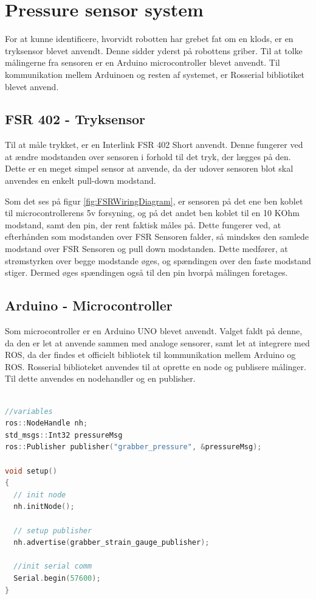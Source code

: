 \section{Pressure sensor system}
For at kunne identificere, hvorvidt robotten har grebet fat om en klods, er en tryksensor blevet anvendt. Denne sidder yderst på robottens griber. Til at tolke målingerne fra sensoren er en Arduino microcontroller blevet anvendt. Til kommunikation mellem Arduinoen og resten af systemet, er Rosserial bibliotiket blevet anvend. 

\subsection{FSR 402 - Tryksensor}
Til at måle trykket, er en Interlink FSR 402 Short anvendt. Denne fungerer ved at ændre modstanden over sensoren i forhold til det tryk, der lægges på den. Dette er en meget simpel sensor at anvende, da der udover sensoren blot skal anvendes en enkelt pull-down modstand. 


Som det ses på figur \ref{fig:FSRWiringDiagram}, er sensoren på det ene ben koblet til microcontrollerens 5v forsyning, og på det andet ben koblet til en 10 KOhm modstand, samt den pin, der rent faktisk måles på. Dette fungerer ved, at efterhånden som modstanden over FSR Sensoren falder, så mindskes den samlede modstand over FSR Sensoren og pull down modstanden. Dette medfører, at strømstyrken over begge modstande øges, og spændingen over den faste modstand stiger. Dermed øges spændingen også til den pin hvorpå målingen foretages. 

\subsection{Arduino - Microcontroller}
Som microcontroller er en Arduino UNO blevet anvendt. Valget faldt på denne, da den er let at anvende sammen med analoge sensorer, samt let at integrere med ROS, da der findes et officielt bibliotek til kommunikation mellem Arduino og ROS. 
Rosserial biblioteket anvendes til at oprette en node og publisere målinger. Til dette anvendes en nodehandler og en publisher. 

\begin{lstlisting}[language=C]

//variables
ros::NodeHandle nh;
std_msgs::Int32 pressureMsg
ros::Publisher publisher("grabber_pressure", &pressureMsg);

void setup()
{
  // init node
  nh.initNode();

  // setup publisher
  nh.advertise(grabber_strain_gauge_publisher);
  
  //init serial comm
  Serial.begin(57600);
}

\end{lstlisting}

